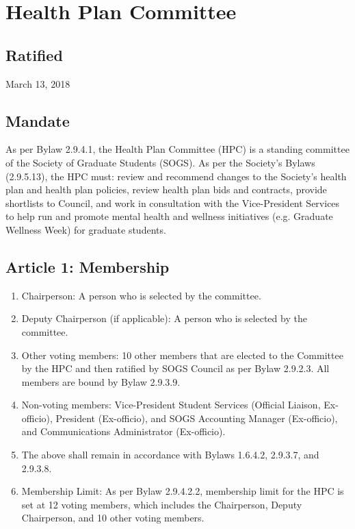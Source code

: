 \section{Health Plan Committee}

\subsection{Ratified}
March 13, 2018

\subsection{Mandate}
As per Bylaw 2.9.4.1, the Health Plan Committee (HPC) is a standing committee of the Society of Graduate Students (SOGS). As per the Society's Bylaws (2.9.5.13), the HPC must: review and recommend changes to the Society's health plan and health plan policies, review health plan bids and contracts, provide shortlists to Council, and work in consultation with the Vice-President Services to help run and promote mental health and wellness initiatives (e.g. Graduate Wellness Week) for graduate students.

\subsection{Article 1: Membership}
\begin{enumerate} [label*=\arabic*., align=left]	
\item Chairperson: A person who is selected by the committee.
\item Deputy Chairperson (if applicable): A person who is selected by the committee.
\item Other voting members: 10 other members that are elected to the Committee by the HPC and then ratified
by SOGS Council as per Bylaw 2.9.2.3. All members are bound by Bylaw 2.9.3.9.
\item Non-voting members: Vice-President Student Services (Official Liaison, Ex-officio), President (Ex-officio),
and SOGS Accounting Manager (Ex-officio), and Communications Administrator (Ex-officio). 
\item The above shall remain in accordance with Bylaws 1.6.4.2, 2.9.3.7, and 2.9.3.8.
\item Membership Limit: As per Bylaw 2.9.4.2.2, membership limit for the HPC is set at 12 voting members, which includes the Chairperson, Deputy Chairperson, and 10 other voting members.
\end{enumerate}


